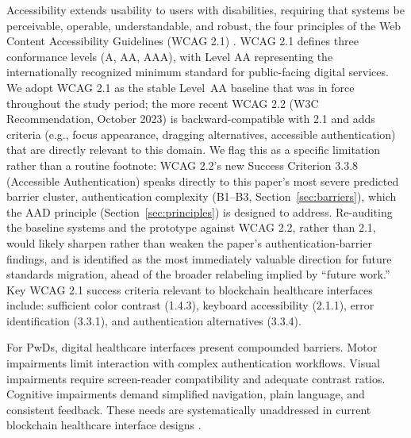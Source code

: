 \documentclass[journal,onecolumn]{IEEEtran}
\begin{document}
Accessibility extends usability to users with disabilities, requiring that systems be perceivable, operable, understandable, and robust, the four principles of the Web Content Accessibility Guidelines (WCAG 2.1) \cite{wcag21}. WCAG 2.1 defines three conformance levels (A, AA, AAA), with Level AA representing the internationally recognized minimum standard for public-facing digital services. We adopt WCAG 2.1 as the stable Level~AA baseline that was in force throughout the study period; the more recent WCAG 2.2 (W3C Recommendation, October 2023) is backward-compatible with 2.1 and adds criteria (e.g., focus appearance, dragging alternatives, accessible authentication) that are directly relevant to this domain. We flag this as a specific limitation rather than a routine footnote: WCAG 2.2's new Success Criterion 3.3.8 (Accessible Authentication) speaks directly to this paper's most severe predicted barrier cluster, authentication complexity (B1--B3, Section~\ref{sec:barriers}), which the AAD principle (Section~\ref{sec:principles}) is designed to address. Re-auditing the baseline systems and the prototype against WCAG 2.2, rather than 2.1, would likely sharpen rather than weaken the paper's authentication-barrier findings, and is identified as the most immediately valuable direction for future standards migration, ahead of the broader relabeling implied by ``future work.'' Key WCAG 2.1 success criteria relevant to blockchain healthcare interfaces include: sufficient color contrast (1.4.3), keyboard accessibility (2.1.1), error identification (3.3.1), and authentication alternatives (3.3.4).

For PwDs, digital healthcare interfaces present compounded barriers. Motor impairments limit interaction with complex authentication workflows. Visual impairments require screen-reader compatibility and adequate contrast ratios. Cognitive impairments demand simplified navigation, plain language, and consistent feedback. These needs are systematically unaddressed in current blockchain healthcare interface designs \cite{khalid2023blockchain}.
\end{document}
